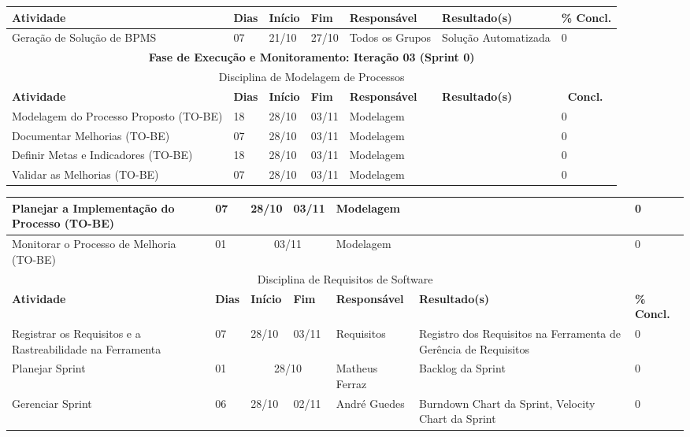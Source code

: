 \begin{landscape}
\begin{center}
\begin{tabular}{|m{6cm}|m{1cm}|m{1cm}|m{1cm}|m{4cm}|m{6cm}|m{2cm}|}
			\textbf{Atividade} & \textbf{Dias} & \textbf{Início} & \textbf{Fim} & \textbf{Responsável} & \textbf{Resultado(s)} & \textbf{\% Concl.} \\ \hline
			Geração de Solução de BPMS & 07 & 21/10 & 27/10 & Todos os Grupos & Solução Automatizada & 0 \\ \hline
			\multicolumn{7}{|c|}{\textbf{Fase de Execução e Monitoramento: Iteração 03 (Sprint 0)}} \\
			\hline
			\multicolumn{7}{|c|}{Disciplina de Modelagem de Processos} \\
			\hline
			\textbf{Atividade} & \textbf{Dias} & \textbf{Início} & \textbf{Fim} & \textbf{Responsável} & \textbf{Resultado(s)} & \textbf{\ Concl.} \\ \hline
			Modelagem do Processo Proposto (TO-BE) & 18 & 28/10 & 03/11 & Modelagem & & 0 \\ \hline
			Documentar Melhorias (TO-BE) & 07 & 28/10 & 03/11 & Modelagem & & 0 \\ \hline
			Definir Metas e Indicadores (TO-BE) & 18 & 28/10 & 03/11 & Modelagem & & 0 \\ \hline
			Validar as Melhorias (TO-BE) & 07 & 28/10 & 03/11 & Modelagem & & 0 \\ \hline
			\end{tabular}
		\end{center}
		\begin{center}
			\begin{tabular}{|m{6cm}|m{1cm}|m{1cm}|m{1cm}|m{4cm}|m{6cm}|m{2cm}|}
			\hline
			Planejar a Implementação do Processo (TO-BE) & 07 & 28/10 & 03/11 & Modelagem & & 0 \\ \hline
			Monitorar o Processo de Melhoria (TO-BE) & 01 & \multicolumn{2}{c|}{03/11} & Modelagem & & 0 \\ \hline
			\multicolumn{7}{|c|}{Disciplina de Requisitos de Software} \\
			\hline
			\textbf{Atividade} & \textbf{Dias} & \textbf{Início} & \textbf{Fim} & \textbf{Responsável} & \textbf{Resultado(s)} & \textbf{\% Concl.} \\ \hline
			Registrar os Requisitos e a Rastreabilidade na Ferramenta & 07 & 28/10 & 03/11 & Requisitos & Registro dos Requisitos na Ferramenta de Gerência de Requisitos & 0 \\ \hline
			Planejar Sprint & 01 & \multicolumn{2}{c|}{28/10} & Matheus Ferraz & Backlog da Sprint & 0 \\ \hline
			Gerenciar Sprint & 06 & 28/10 & 02/11 & André Guedes & Burndown Chart da Sprint, Velocity Chart da Sprint & 0 \\ \hline

\end{tabular}
\end{center}
\end{landscape}
